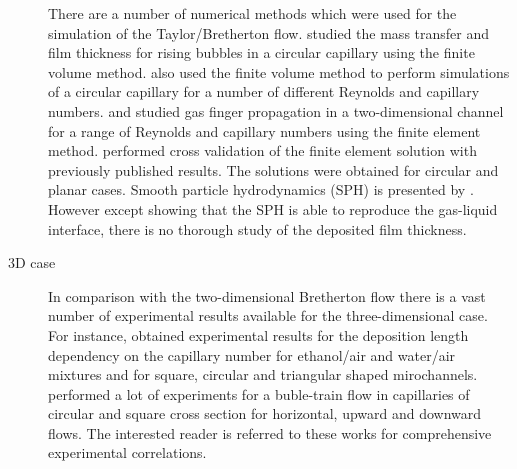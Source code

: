 \documentclass{CFD2011}
\begin{document}
\begin{description}
There are a number of numerical methods which
were used for the simulation of the Taylor/Bretherton flow.
\citet{vanbaten-circular} studied the mass transfer and film
thickness for rising bubbles in a circular capillary using the finite volume method.
\citet{kreutzer-pressure-drop} also used the finite volume method to perform
simulations of a circular capillary for a number of different
Reynolds and capillary numbers. 
\citet{heil-bretherton} and \citet{ingham-plates} studied gas finger propagation in
a two-dimensional channel for a range of Reynolds and capillary
numbers using the finite element method. \citet{giavedoni-numerical} performed cross validation of
the
finite element solution with previously published results.
The solutions were obtained for circular and planar cases. Smooth particle hydrodynamics (SPH) is
presented by \citet{huang-sph}. However except showing that the SPH is able to reproduce the
gas-liquid interface, there is no thorough study of the deposited film thickness. 

\item[3D case]
In comparison with the two-dimensional Bretherton flow there is a vast number of experimental
results available for the three-dimensional case. For instance, \citet{shikazono-square} obtained
experimental
results for the deposition length dependency on the
capillary number for ethanol/air and water/air mixtures and for square, circular and triangular
shaped mirochannels. \citet{cerro-bubble-train} performed a lot of experiments for a buble-train
flow in capillaries of
circular and square cross section for horizontal, upward and downward flows. The interested reader
is referred to these works for comprehensive experimental correlations.


\end{description}
\end{document}
